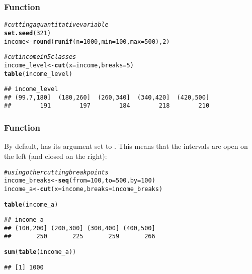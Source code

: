 \documentclass[12pt]{beamer}\usepackage[]{graphicx}\usepackage[]{color}
\makeatletter
\newcommand{\hlnum}[1]{\textcolor[rgb]{0.686,0.059,0.569}{#1}}%
\newcommand{\hlcom}[1]{\textcolor[rgb]{0.678,0.584,0.686}{\textit{#1}}}%
\newcommand{\hlstd}[1]{\textcolor[rgb]{0.345,0.345,0.345}{#1}}%
\newcommand{\hlkwb}[1]{\textcolor[rgb]{0.69,0.353,0.396}{#1}}%
\newcommand{\hlkwc}[1]{\textcolor[rgb]{0.333,0.667,0.333}{#1}}%
\newcommand{\hlkwd}[1]{\textcolor[rgb]{0.737,0.353,0.396}{\textbf{#1}}}%
\newenvironment{kframe}{%
 \def\at@end@of@kframe{}%
 \ifinner\ifhmode%
  \def\at@end@of@kframe{\end{minipage}}%
  \begin{minipage}{\columnwidth}%
 \fi\fi%
 \def\FrameCommand##1{\hskip\@totalleftmargin \hskip-\fboxsep
 \colorbox{shadecolor}{##1}\hskip-\fboxsep
     \hskip-\linewidth \hskip-\@totalleftmargin \hskip\columnwidth}%
 \MakeFramed {\advance\hsize-\width
   \@totalleftmargin\z@ \linewidth\hsize
   \@setminipage}}%
 {\par\unskip\endMakeFramed%
 \at@end@of@kframe}
\newenvironment{knitrout}{}{} %
\makeatother
\begin{document}
\begin{frame}[fragile]
\frametitle{Function }

\begin{knitrout}\footnotesize
{}\color{fgcolor}\begin{kframe}
\begin{alltt}
\hlcom{# cutting a quantitative variable}
\hlkwd{set.seed}\hlstd{(}\hlnum{321}\hlstd{)}
\hlstd{income} \hlkwb{<-} \hlkwd{round}\hlstd{(}\hlkwd{runif}\hlstd{(}\hlkwc{n} \hlstd{=} \hlnum{1000}\hlstd{,} \hlkwc{min} \hlstd{=} \hlnum{100}\hlstd{,} \hlkwc{max} \hlstd{=} \hlnum{500}\hlstd{),} \hlnum{2}\hlstd{)}

\hlcom{# cut income in 5 classes}
\hlstd{income_level} \hlkwb{<-} \hlkwd{cut}\hlstd{(}\hlkwc{x} \hlstd{= income,} \hlkwc{breaks} \hlstd{=} \hlnum{5}\hlstd{)}
\hlkwd{table}\hlstd{(income_level)}
\end{alltt}
\begin{verbatim}
## income_level
## (99.7,180]  (180,260]  (260,340]  (340,420]  (420,500] 
##        191        197        184        218        210
\end{verbatim}
\end{kframe}
\end{knitrout}

\end{frame}


\begin{frame}[fragile]
\frametitle{Function }

By default,  has its argument  set to . This means that the intervals are open on the left (and closed on the right):
\begin{knitrout}\footnotesize
{}\color{fgcolor}\begin{kframe}
\begin{alltt}
\hlcom{# using other cutting break points}
\hlstd{income_breaks} \hlkwb{<-} \hlkwd{seq}\hlstd{(}\hlkwc{from} \hlstd{=} \hlnum{100}\hlstd{,} \hlkwc{to} \hlstd{=} \hlnum{500}\hlstd{,} \hlkwc{by} \hlstd{=} \hlnum{100}\hlstd{)}
\hlstd{income_a} \hlkwb{<-} \hlkwd{cut}\hlstd{(}\hlkwc{x} \hlstd{= income,} \hlkwc{breaks} \hlstd{= income_breaks)}

\hlkwd{table}\hlstd{(income_a)}
\end{alltt}
\begin{verbatim}
## income_a
## (100,200] (200,300] (300,400] (400,500] 
##       250       225       259       266
\end{verbatim}
\begin{alltt}
\hlkwd{sum}\hlstd{(}\hlkwd{table}\hlstd{(income_a))}
\end{alltt}
\begin{verbatim}
## [1] 1000
\end{verbatim}
\end{kframe}
\end{knitrout}

\end{frame}
\end{document}
